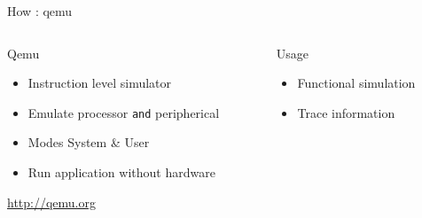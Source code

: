 %
\begin{Frame}{How : qemu}
  \begin{columns}[t]
    \begin{column}{\BW} %
      \begin{block}{Qemu}
        \begin{itemize}
        \item Instruction level simulator
        \item Emulate processor \texttt{and} peripherical
        \item Modes System \& User
        \item Run application without hardware
        \end{itemize}
      \url{http://qemu.org}
      \end{block} 
    \end{column}
    
    \begin{column}{\BW} %
      \begin{block}{Usage}
        \begin{itemize}
        \item Functional simulation
        \item Trace information
        \end{itemize}
      \end{block}   
    \end{column}
  \end{columns}  
\end{Frame}


